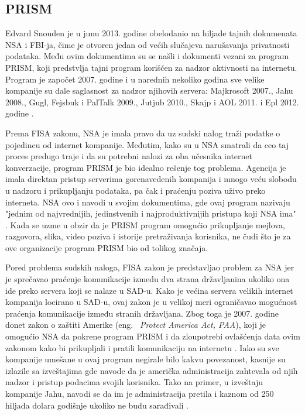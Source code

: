 \documentclass[a4paper]{article}
\begin{document}
\subsection{PRISM}
\label{subsec:prism}
Edvard Snouden je u junu 2013. godine obelodanio na hiljade tajnih dokumenata NSA i FBI-ja, čime je otvoren jedan od većih slučajeva narušavanja privatnosti podataka. Među ovim dokumentima su se našli i dokumenti vezani za program PRISM, koji predstvlja tajni program korišćen za nadzor aktivnosti na internetu. Program je započet 2007. godine i u narednih nekoliko godina sve velike kompanije su dale saglasnost za nadzor njihovih servera: Majkrosoft 2007., Jahu 2008., Gugl, Fejsbuk i PalTalk 2009., Jutjub 2010., Skajp i AOL 2011. i Epl 2012. godine \cite{prism}. 
\par Prema FISA zakonu, NSA je imala pravo da uz sudski nalog traži podatke o pojedincu od internet kompanije. Međutim, kako su u NSA smatrali da ceo taj proces predugo traje i da su potrebni nalozi za oba učesnika internet konverzacije, program PRISM je bio idealno rešenje tog problema. Agencija je imala direktan pristup serverima gorenavedenih kompanija i mnogo veću slobodu u nadzoru i prikupljanju podataka, pa čak i praćenju poziva uživo preko interneta. NSA ovo i navodi u svojim dokumentima, gde ovaj program nazivaju "jednim od najvrednijih, jedinstvenih i najproduktivnijih pristupa koji NSA ima" \cite{prism}. Kada se uzme u obzir da je PRISM program omogućio prikupljanje mejlova, razgovora, slika, video poziva i istorije pretraživanja korisnika, ne čudi što je za ove organizacije program PRISM bio od tolikog značaja.
\par Pored problema sudskih naloga, FISA zakon je predstavljao problem za NSA jer je sprečavao praćenje komunikacije izmedu dva strana državljanina ukoliko ona ide preko servera koji se nalaze u SAD-u. Kako je većina servera velikih internet kompanija locirano u SAD-u, ovaj zakon je u velikoj meri ograničavao mogućnost praćenja komunikacije između stranih državljana. Zbog toga je 2007. godine donet zakon o zaštiti Amerike (eng. ~{\em Protect America Act, PAA}), koji je omogućio NSA da pokrene program PRISM i da zloupotrebi ovlašćenja data ovim zakonom kako bi prikupljali i pratili komunikaciju na internetu \cite{prism1}. Iako su sve kompanije umešane u ovaj program negirale bilo kakvu povezanost, kasnije su izlazile sa izveštajima gde navode da je američka administracija zahtevala od njih nadzor i pristup podacima svojih korisnika. Tako na primer, u izveštaju kompanije Jahu, navodi se da im je administracija pretila i kaznom od 250 hiljada dolara godišnje ukoliko ne budu sarađivali \cite{prism2}. 
\end{document}
